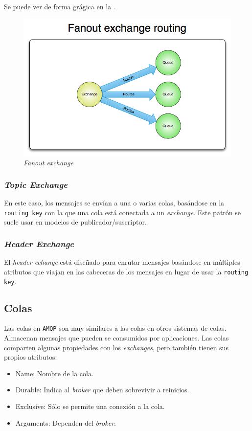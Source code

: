 Se puede ver de forma grágica en la .

\begin{figure}[htbp]
\centering
\includegraphics[width=0.75\linewidth]{03-mqtt_stomp_amqp/figuras/fig004}
\caption{\emph{Fanout exchange}}
\label{fig:figura4}
\end{figure}

\subsubsection{\emph{Topic Exchange}}

En este caso, los mensajes se envían a una o varias colas, basándose en la
\texttt{routing key} con la que una cola está conectada a un \emph{exchange}. Este
patrón se suele usar en modelos de publicador/suscriptor.

\subsubsection{\emph{Header Exchange}}

El \emph{header echange} está diseñado para enrutar mensajes basándose en múltiples
atributos que viajan en las cabeceras de los mensajes en lugar de usar la
\texttt{routing key}.

\subsection{Colas}

Las colas en \texttt{AMQP} son muy similares a las colas en otros sistemas de
colas. Almacenan mensajes que pueden se consumidos por aplicaciones. Las colas
comparten algunas propiedades con los \emph{exchanges}, pero también tienen sus
propios atributos:

\begin{itemize}\itemsep1pt \parskip0pt 
\item Name: Nombre de la cola.
\item Durable: Indica al \emph{broker} que deben sobrevivir a
reinicios.
\item Exclusive: Sólo se permite una conexión a la cola.
\item Arguments: Dependen del \emph{broker}.
\end{itemize}

